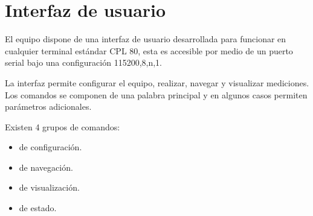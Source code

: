 \newpage

\section{Interfaz de usuario}
El equipo dispone de una interfaz de usuario desarrollada para funcionar en cualquier terminal estándar CPL 80, esta es accesible por medio de un puerto serial bajo una configuración 115200,8,n,1.

La interfaz permite configurar el equipo, realizar, navegar y visualizar mediciones. Los comandos se componen de una palabra principal y en algunos casos permiten parámetros adicionales. 

\vspace{5mm}

Existen 4 grupos de comandos:
\begin{itemize}
\item  de configuración.
\item  de navegación.
\item  de visualización.
\item de estado. 

\end{itemize}

\vspace{5mm}

